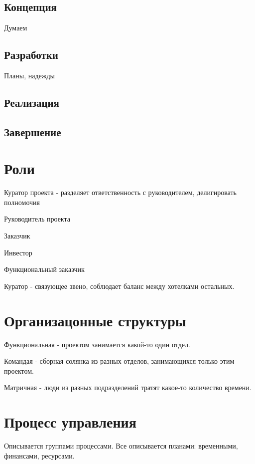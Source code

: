 \subsection{Концепция}
Думаем
\subsection{Разработки}
Планы, надежды
\subsection{Реализация}
\subsection{Завершение}

\section{Роли}

\begin{itemsize}
\item Куратор проекта - разделяет ответственность с руководителем, делигировать полномочия
\item Руководитель проекта
\item Заказчик
\item Инвестор
\item Функциональный заказчик
\item Куратор - связующее звено, соблюдает баланс между хотелками остальных.
\end{itemsize}

\section{Организацонные структуры}

\begin{itemsize}
\item Функциональная - проектом занимается какой-то один отдел.
\item Командая - сборная  солянка из разных отделов, занимающихся только этим проектом.
\item Матричная - люди из разных подразделений тратят какое-то количество времени.
\end{itemsize}

\section{Процесс управления}
Описывается группами процессами. Все описывается планами: временными, финансами, ресурсами.

